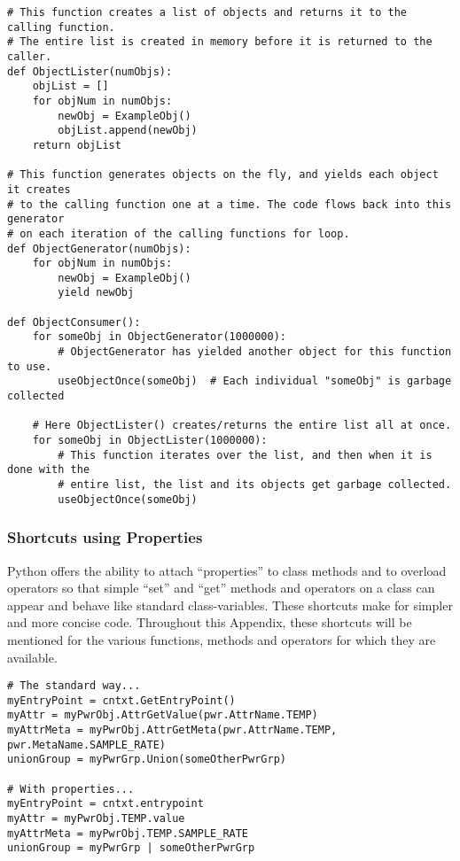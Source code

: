 \begin{center}\begin{minipage}{.95\linewidth}\begin{lstlisting}
# This function creates a list of objects and returns it to the calling function.
# The entire list is created in memory before it is returned to the caller.
def ObjectLister(numObjs):
    objList = []
    for objNum in numObjs:
        newObj = ExampleObj()
        objList.append(newObj)
    return objList

# This function generates objects on the fly, and yields each object it creates
# to the calling function one at a time. The code flows back into this generator
# on each iteration of the calling functions for loop.
def ObjectGenerator(numObjs):
    for objNum in numObjs:
        newObj = ExampleObj()
        yield newObj

def ObjectConsumer():
    for someObj in ObjectGenerator(1000000):
        # ObjectGenerator has yielded another object for this function to use.
        useObjectOnce(someObj)  # Each individual "someObj" is garbage collected

    # Here ObjectLister() creates/returns the entire list all at once.
    for someObj in ObjectLister(1000000):
        # This function iterates over the list, and then when it is done with the
        # entire list, the list and its objects get garbage collected.
        useObjectOnce(someObj)

\end{lstlisting}\end{minipage}\end{center}

\subsubsection{Shortcuts using Properties}\label{sec:PythonShortcutsProperties}
Python offers the ability to attach ``properties'' to class methods and to
overload operators so that simple ``set'' and ``get'' methods and operators
on a class can appear and behave like standard class-variables. These
shortcuts make for simpler and more concise code. Throughout this Appendix,
these shortcuts will be mentioned for the various functions, methods and
operators for which they are available.
\begin{center}\begin{minipage}{.95\linewidth}\begin{lstlisting}
# The standard way...
myEntryPoint = cntxt.GetEntryPoint()
myAttr = myPwrObj.AttrGetValue(pwr.AttrName.TEMP)
myAttrMeta = myPwrObj.AttrGetMeta(pwr.AttrName.TEMP, pwr.MetaName.SAMPLE_RATE)
unionGroup = myPwrGrp.Union(someOtherPwrGrp)

# With properties...
myEntryPoint = cntxt.entrypoint
myAttr = myPwrObj.TEMP.value
myAttrMeta = myPwrObj.TEMP.SAMPLE_RATE
unionGroup = myPwrGrp | someOtherPwrGrp
\end{lstlisting}\end{minipage}\end{center}

